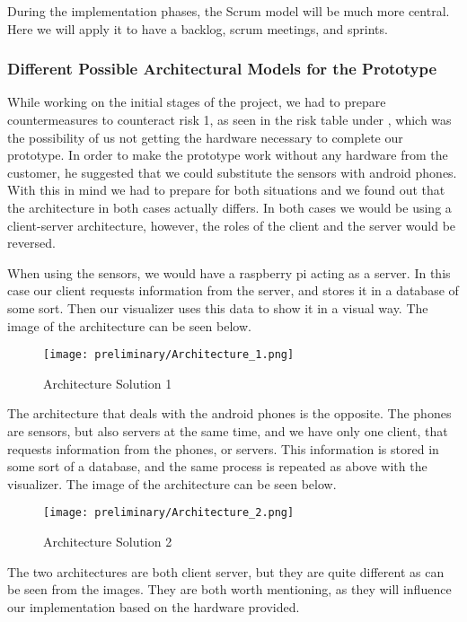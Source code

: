 \documentclass[../document]{subfiles}
\begin{document}
During the implementation phases, the Scrum model will be much more central. Here we will apply it to have a backlog, scrum meetings, and sprints.

\subsubsection{Different Possible Architectural Models for the Prototype}
While working on the initial stages of the project, we had to prepare countermeasures to counteract risk 1, as seen in the risk table under , which was the possibility of us not getting the hardware necessary to complete our prototype. In order to make the prototype work without any hardware from the customer, he suggested that we could substitute the sensors with android phones. With this in mind we had to prepare for both situations and we found out that the architecture in both cases actually differs. In both cases we would be using a client-server architecture, however, the roles of the client and the server would be reversed.

When using the sensors, we would have a raspberry pi acting as a server. In this case our client requests information from the server, and stores it in a database of some sort. Then our visualizer uses this data to show it in a visual way. The image of the architecture can be seen below.

\begin{figure}[H]
	\texttt{[image: preliminary/Architecture\_1.png]}
	\caption{Architecture Solution 1}
\end{figure}

The architecture that deals with the android phones is the opposite. The phones are sensors, but also servers at the same time, and we have only one client, that requests information from the phones, or servers. This information is stored in some sort of a database, and the same process is repeated as above with the visualizer. The image of the architecture can be seen below.

\begin{figure}[H]
	\texttt{[image: preliminary/Architecture\_2.png]}
	\caption{Architecture Solution 2}
\end{figure}

The two architectures are both client server, but they are quite different as can be seen from the images. They are both worth mentioning, as they will influence our implementation based on the hardware provided.
\end{document}
